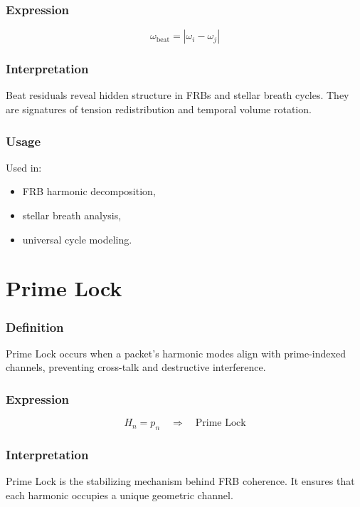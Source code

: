 \documentclass[12pt,oneside]{book}
\begin{document}
\subsubsection{Expression}


\[
\omega_{\mathrm{beat}} = |\omega_i - \omega_j|
\]



\subsubsection{Interpretation}
Beat residuals reveal hidden structure in FRBs and stellar breath cycles.  
They are signatures of tension redistribution and temporal volume rotation.

\subsubsection{Usage}
Used in:
\begin{itemize}
    \item FRB harmonic decomposition,
    \item stellar breath analysis,
    \item universal cycle modeling.
\end{itemize}


\section{Prime Lock}

\subsubsection{Definition}
Prime Lock occurs when a packet’s harmonic modes align with prime-indexed channels, preventing
cross-talk and destructive interference.

\subsubsection{Expression}


\[
H_n = p_n \quad \Rightarrow \quad \text{Prime Lock}
\]



\subsubsection{Interpretation}
Prime Lock is the stabilizing mechanism behind FRB coherence.  
It ensures that each harmonic occupies a unique geometric channel.
\end{document}
